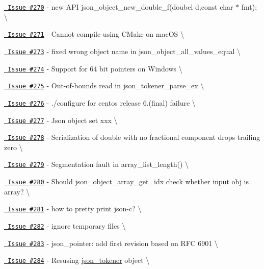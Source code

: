 \begin{DoxyItemize}
\item \href{https://github.com/json-c/json-c/issues/270}{\texttt{ Issue \#270}} -\/ new API json\+\_\+object\+\_\+new\+\_\+double\+\_\+f(doubel d,const char $\ast$ fmt); \textbackslash{}
\item \href{https://github.com/json-c/json-c/issues/271}{\texttt{ Issue \#271}} -\/ Cannot compile using CMake on mac\+OS \textbackslash{}
\item \href{https://github.com/json-c/json-c/issues/273}{\texttt{ Issue \#273}} -\/ fixed wrong object name in json\+\_\+object\+\_\+all\+\_\+values\+\_\+equal \textbackslash{}
\item \href{https://github.com/json-c/json-c/issues/274}{\texttt{ Issue \#274}} -\/ Support for 64 bit pointers on Windows \textbackslash{}
\item \href{https://github.com/json-c/json-c/issues/275}{\texttt{ Issue \#275}} -\/ Out-\/of-\/bounds read in json\+\_\+tokener\+\_\+parse\+\_\+ex \textbackslash{}
\item \href{https://github.com/json-c/json-c/issues/276}{\texttt{ Issue \#276}} -\/ ./configure for centos release 6.(final) failure \textbackslash{}
\item \href{https://github.com/json-c/json-c/issues/277}{\texttt{ Issue \#277}} -\/ Json object set xxx \textbackslash{}
\item \href{https://github.com/json-c/json-c/issues/278}{\texttt{ Issue \#278}} -\/ Serialization of double with no fractional component drops trailing zero \textbackslash{}
\item \href{https://github.com/json-c/json-c/issues/279}{\texttt{ Issue \#279}} -\/ Segmentation fault in array\+\_\+list\+\_\+length() \textbackslash{}
\item \href{https://github.com/json-c/json-c/issues/280}{\texttt{ Issue \#280}} -\/ Should json\+\_\+object\+\_\+array\+\_\+get\+\_\+idx check whether input obj is array? \textbackslash{}
\item \href{https://github.com/json-c/json-c/issues/281}{\texttt{ Issue \#281}} -\/ how to pretty print json-\/c? \textbackslash{}
\item \href{https://github.com/json-c/json-c/issues/282}{\texttt{ Issue \#282}} -\/ ignore temporary files \textbackslash{}
\item \href{https://github.com/json-c/json-c/issues/283}{\texttt{ Issue \#283}} -\/ json\+\_\+pointer\+: add first revision based on RFC 6901 \textbackslash{}
\item \href{https://github.com/json-c/json-c/issues/284}{\texttt{ Issue \#284}} -\/ Resusing \mbox{\hyperlink{structjson__tokener}{json\+\_\+tokener}} object \textbackslash{}

\end{DoxyItemize}

